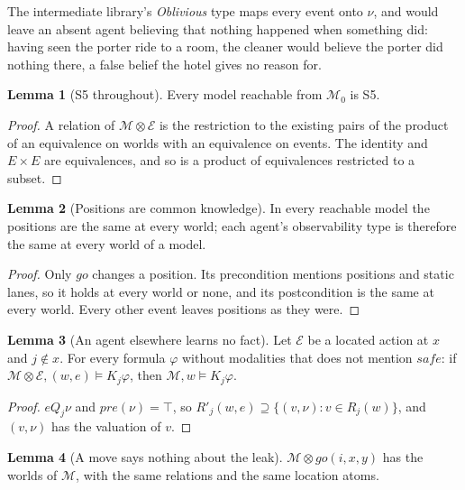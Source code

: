 \documentclass[11pt,a4paper]{article}
\theoremstyle{definition}
\newtheorem{lemma}{Lemma}
\newcommand{\Mod}{\mathcal{M}}
\newcommand{\Ev}{\mathcal{E}}
\newcommand{\prd}{\otimes}
\newcommand{\pre}{\mathit{pre}}
\newcommand{\safe}{\mathit{safe}}
\begin{document}
The intermediate library's \emph{Oblivious} type maps every event onto $\nu$,
and would leave an absent agent believing that nothing happened when something
did: having seen the porter ride to a room, the cleaner would believe the porter
did nothing there, a false belief the hotel gives no reason for.

\begin{lemma}[S5 throughout]
\label{lem:s5}
Every model reachable from $\Mod_0$ is S5.
\end{lemma}

\begin{proof}
A relation of $\Mod \prd \Ev$ is the restriction to the existing pairs of the
product of an equivalence on worlds with an equivalence on events. The identity
and $E \times E$ are equivalences, and so is a product of equivalences
restricted to a subset.
\end{proof}

\begin{lemma}[Positions are common knowledge]
\label{lem:pos}
In every reachable model the positions are the same at every world; each
agent's observability type is therefore the same at every world of a model.
\end{lemma}

\begin{proof}
Only $\mathit{go}$ changes a position. Its precondition mentions positions and
static lanes, so it holds at every world or none, and its postcondition is the
same at every world. Every other event leaves positions as they were.
\end{proof}

\begin{lemma}[An agent elsewhere learns no fact]
\label{lem:absent}
Let $\Ev$ be a located action at $x$ and $j \notin x$. For every formula
$\varphi$ without modalities that does not mention $\safe$: if
$\Mod \prd \Ev, (w,e) \models K_j\varphi$, then $\Mod, w \models K_j\varphi$.
\end{lemma}

\begin{proof}
$e \mathrel{Q_j} \nu$ and $\pre(\nu) = \top$, so
$R'_j(w,e) \supseteq \{(v, \nu) : v \in R_j(w)\}$, and $(v, \nu)$ has the
valuation of $v$.
\end{proof}

\begin{lemma}[A move says nothing about the leak]
\label{lem:move}
$\Mod \prd \mathit{go}(i, x, y)$ has the worlds of $\Mod$, with the same
relations and the same location atoms.
\end{lemma}
\end{document}
